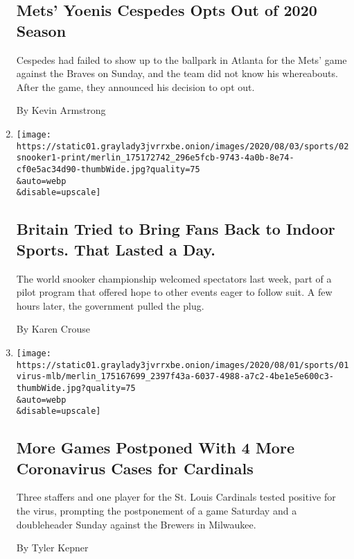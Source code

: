\begin{enumerate}
  \hypertarget{mets-yoenis-cespedes-opts-out-of-2020-season}{%
  \subsection{Mets' Yoenis Cespedes Opts Out of 2020
  Season}\label{mets-yoenis-cespedes-opts-out-of-2020-season}}

  Cespedes had failed to show up to the ballpark in Atlanta for the
  Mets' game against the Braves on Sunday, and the team did not know his
  whereabouts. After the game, they announced his decision to opt out.

  By Kevin Armstrong
\item
  \href{/2020/08/02/sports/snooker-world-championship.html}{}

  \texttt{[image: https://static01.graylady3jvrrxbe.onion/images/2020/08/03/sports/02snooker1-print/merlin\_175172742\_296e5fcb-9743-4a0b-8e74-cf0e5ac34d90-thumbWide.jpg?quality=75\\\&auto=webp\\\&disable=upscale]}

  \hypertarget{britain-tried-to-bring-fans-back-to-indoor-sports-that-lasted-a-day}{%
  \subsection{Britain Tried to Bring Fans Back to Indoor Sports. That
  Lasted a
  Day.}\label{britain-tried-to-bring-fans-back-to-indoor-sports-that-lasted-a-day}}

  The world snooker championship welcomed spectators last week, part of
  a pilot program that offered hope to other events eager to follow
  suit. A few hours later, the government pulled the plug.

  By Karen Crouse
\item
  \href{/2020/08/01/sports/baseball/coronavirus-cardinals.html}{}

  \texttt{[image: https://static01.graylady3jvrrxbe.onion/images/2020/08/01/sports/01virus-mlb/merlin\_175167699\_2397f43a-6037-4988-a7c2-4be1e5e600c3-thumbWide.jpg?quality=75\\\&auto=webp\\\&disable=upscale]}

  \hypertarget{more-games-postponed-with-4-more-coronavirus-cases-for-cardinals}{%
  \subsection{More Games Postponed With 4 More Coronavirus Cases for
  Cardinals}\label{more-games-postponed-with-4-more-coronavirus-cases-for-cardinals}}

  Three staffers and one player for the St. Louis Cardinals tested
  positive for the virus, prompting the postponement of a game Saturday
  and a doubleheader Sunday against the Brewers in Milwaukee.

  By Tyler Kepner
\end{enumerate}

